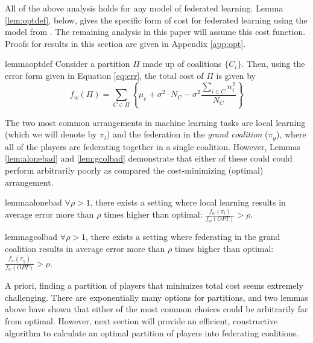 \documentclass{article}
\newcommand{\cb}[1]{\left\{ #1 \right\}}
\newcommand{\cd}[0]{\cdot}
\newcommand{\mue}[0]{\ensuremath{\mu_e}}
\newcommand{\var}[0]{\ensuremath{\sigma^2}}
\newcommand{\ndraw}[0]{\ensuremath{n}}
\newcommand{\total}[0]{\ensuremath{N}}
\newcommand{\alone}[0]{\ensuremath{\pi_l}}
\newcommand{\gcol}[0]{\ensuremath{\pi_g}}
\newcommand{\col}[0]{\ensuremath{C}}
\newcommand{\costw}[0]{\ensuremath{f_w}}
\newcommand{\partition}[0]{\ensuremath{\Pi}}
\begin{document}
All of the above analysis holds for any model of federated learning. Lemma \ref{lem:optdef}, below, gives the specific form of cost for federated learning using the model from \cite{donahue2020model}. The remaining analysis in this paper will assume this cost function. Proofs for results in this section are given in Appendix \ref{app:opt}. 


\begin{restatable}{lemma}{optdef}
\label{lem:optdef}
Consider a partition $\partition$ made up of coalitions $\{\col_i\}$. Then, using the error form given in Equation \ref{eq:err}, the total cost of $\partition$ is given by
$$\costw(\partition) = \sum_{\col \in \partition}\cb{\mue + \var \cd \total_{\col} - \var \frac{\sum_{i \in \col} \ndraw_i^2}{\total_{\col}}}$$
\end{restatable}


The two most common arrangements in machine learning tasks are local learning (which we will denote by $\alone$) and the federation in the \emph{grand coalition} ($\gcol$), where all of the players are federating together in a single coalition. However, Lemmas \ref{lem:alonebad} and \ref{lem:gcolbad} demonstrate that either of these could could perform arbitrarily poorly as compared the cost-minimizing (optimal) arrangement.

\begin{restatable}{lemma}{alonebad}
\label{lem:alonebad}
$\forall \rho>1$, there exists a setting where local learning results in average error more than $\rho$ times higher than optimal: $\frac{\costw(\alone)}{\costw(OPT)} > \rho$. 
\end{restatable}


\begin{restatable}{lemma}{gcolbad}
\label{lem:gcolbad}
$\forall \rho > 1$, there exists a setting where federating in the grand coalition results in average error more than $\rho$ times higher than optimal: $\frac{\costw(\gcol)}{\costw(OPT)} > \rho$. 
\end{restatable}

A priori, finding a partition of players that minimizes total cost seems extremely challenging. There are exponentially many options for partitions, and two lemmas above have shown that either of the most common choices could be arbitrarily far from optimal. However, next section will provide an efficient, constructive algorithm to calculate an optimal partition of players into federating coalitions.
\end{document}
